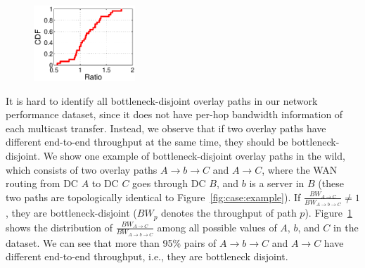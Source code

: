 \begin{figure}[t]
\centering
\includegraphics[width=1.5in]{images/potential_v2.eps}%
\label{fig:case:size}
\vspace{-0.4cm}
\end{figure}

It is hard to identify all bottleneck-disjoint overlay paths in our
network performance dataset, since it does not have per-hop bandwidth information of each
multicast transfer.
Instead, we observe that if two overlay paths have different end-to-end
throughput at the same time, they should be bottleneck-disjoint.
We show one example of bottleneck-disjoint overlay paths in the wild,
which consists of two overlay paths $A$$\rightarrow$$b$$\rightarrow$$C$
and $A$$\rightarrow$$C$, where the WAN routing from DC $A$ to DC $C$ goes
through DC $B$, and $b$ is a server in $B$ (these two paths are
topologically identical to Figure~\ref{fig:case:example}).
If $\frac{BW_{A\rightarrow C}}{BW_{A\rightarrow b\rightarrow C}}\neq1$,
they are bottleneck-disjoint ($BW_p$ denotes the throughput of path $p$).
Figure~\ref{fig:case:size} shows the distribution of
$\frac{BW_{A\rightarrow C}}{BW_{A\rightarrow b\rightarrow C}}$
among all possible values of $A$, $b$, and $C$ in the dataset.
We can see that more than 95\% pairs of $A$$\rightarrow$$b$$\rightarrow$$C$
and $A$$\rightarrow$$C$ have different end-to-end throughput, i.e.,
they are bottleneck disjoint.

